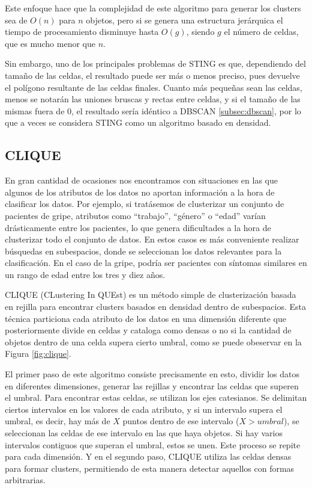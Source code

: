 \documentclass[10pt, a4paper]{article}
\begin{document}
Este enfoque hace que la complejidad de este algoritmo para generar los clusters sea de $O\left(n\right)$ para $n$ objetos, pero si se genera una estructura jerárquica el tiempo de procesamiento disminuye hasta $O\left(g\right)$, siendo $g$ el número de celdas, que es mucho menor que $n$.

Sin embargo, uno de los principales problemas de STING es que, dependiendo del tamaño de las celdas, el resultado puede ser más o menos preciso, pues devuelve el polígono resultante de las celdas finales. Cuanto más pequeñas sean las celdas, menos se notarán las uniones bruscas y rectas entre celdas, y si el tamaño de las mismas fuera de 0, el resultado sería idéntico a DBSCAN \ref{subsec:dbscan}, por lo que a veces se considera STING como un algoritmo basado en densidad.




\subsection{\textbf{CLIQUE}} \label{subsec:clique}

En gran cantidad de ocasiones nos encontramos con situaciones en las que algunos de los atributos de los datos no aportan información a la hora de clasificar los datos. Por ejemplo, si tratásemos de clusterizar un conjunto de pacientes de gripe, atributos como ``trabajo'', ``género'' o ``edad'' varían drásticamente entre los pacientes, lo que genera dificultades a la hora de clusterizar todo el conjunto de datos. En estos casos es más conveniente realizar búsquedas en subespacios, donde se seleccionan los datos relevantes para la clasificación. En el caso de la gripe, podría ser pacientes con síntomas similares en un rango de edad entre los tres y diez años. 

  CLIQUE (CLustering In QUEst) es un método simple de clusterización basada en rejilla para encontrar clusters basados en densidad dentro de subespacios. Esta técnica particiona cada atributo de los datos en una dimensión diferente que posteriormente divide en celdas y cataloga como densas o no si la cantidad de objetos dentro de una celda supera cierto umbral, como se puede obeservar en la Figura \ref{fig:clique}.

El primer paso de este algoritmo consiste precisamente en esto, dividir los datos en diferentes dimensiones, generar las rejillas y encontrar las celdas que superen el umbral. Para encontrar estas celdas, se utilizan los ejes catesianos. Se delimitan ciertos intervalos en los valores de cada atributo, y si un intervalo supera el umbral, es decir, hay más de $X$ puntos dentro de ese intervalo ($X > umbral$), se seleccionan las celdas de ese intervalo en las que haya objetos. Si hay varios intervalos contiguos que superan el umbral, estos se unen. Este proceso se repite para cada dimensión. Y en el segundo paso, CLIQUE utiliza las celdas densas para formar clusters, permitiendo de esta manera detectar aquellos con formas arbitrarias.
\end{document}
